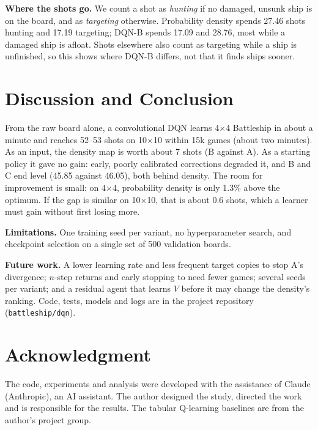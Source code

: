 \documentclass[conference,10pt]{IEEEtran}
\begin{document}
\textbf{Where the shots go.} We count a shot as \emph{hunting} if no damaged,
unsunk ship is on the board, and as \emph{targeting} otherwise. Probability
density spends 27.46 shots hunting and 17.19 targeting; DQN-B spends 17.09 and
28.76, most while a damaged ship is afloat. Shots elsewhere also count as
targeting while a ship is unfinished, so this shows where DQN-B differs, not
that it finds ships sooner.

\section{Discussion and Conclusion}
From the raw board alone, a convolutional DQN learns 4$\times$4 Battleship in
about a minute and reaches 52--53 shots on 10$\times$10 within 15k games (about
two minutes). As an input, the density map is worth about 7 shots (B against A).
As a starting policy it gave no gain: early, poorly calibrated corrections
degraded it, and B and C end level (45.85 against 46.05), both behind density. The room for improvement is small: on 4$\times$4,
probability density is only 1.3\% above the optimum. If the gap is similar on
10$\times$10, that is about 0.6 shots, which a learner must gain without first
losing more.

\textbf{Limitations.} One training seed per variant, no hyperparameter search,
and checkpoint selection on a single set of 500 validation boards.

\textbf{Future work.} A lower learning rate and less frequent target copies to
stop A's divergence; $n$-step returns and early stopping to need fewer games;
several seeds per variant; and a residual agent that learns $V$ before it may
change the density's ranking. Code, tests, models and logs are in the project
repository (\texttt{battleship/dqn}).

\section*{Acknowledgment}
The code, experiments and analysis were developed with the assistance of Claude
(Anthropic), an AI assistant. The author designed the study, directed the work
and is responsible for the results. The tabular Q-learning baselines are from the
author's project group.
\end{document}
